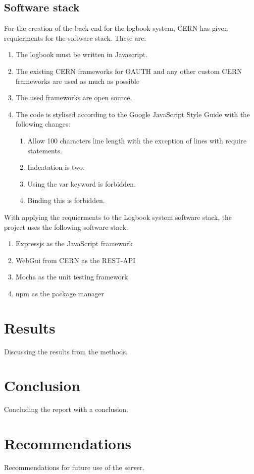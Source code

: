 \documentclass[paper=a4, fontsize=11pt,twoside]{scrartcl}	%
\begin{document}
\subsection{Software stack}
For the creation of the back-end for the logbook system, CERN has given requierments for the software stack. These are:
\begin{enumerate}
\item The logbook must be written in Javascript.
\item The existing CERN frameworks for OAUTH and any other custom CERN frameworks are used as much as possible
\item The used frameworks are open source.
\item The code is stylised according to the Google JavaScript Style Guide with the following changes:
\begin{enumerate}
\item Allow 100 characters line length with the exception of lines with require statements.
\item Indentation is two.
\item Using the var keyword is forbidden.
\item Binding this is forbidden.
\end{enumerate}
\end{enumerate}
With applying the requierments to the Logbook system software stack, the project uses the following software stack:
\begin{enumerate}
\item Expressjs as the JavaScript framework
\item WebGui from CERN as the REST-API
\item Mocha as the unit testing framework
\item npm as the package manager
\end{enumerate}
\newpage
\section{Results}
Discussing the results from the methods.
\newpage
\section{Conclusion}
Concluding the report with a conclusion.
\newpage
\section{Recommendations}
Recommendations for future use of the server.
\newpage
\end{document}
